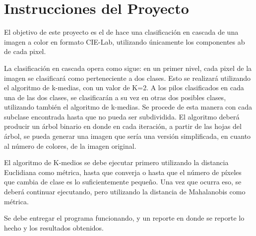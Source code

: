 \section{Instrucciones del Proyecto}\label{sec:project-instructions}
El objetivo de este proyecto es el de hace una clasificación en cascada de una imagen a color en formato CIE-Lab, utilizando únicamente los componentes ab de cada pixel.

La clasificación en cascada opera como sigue: en un primer nivel, cada pixel de la imagen se clasificará como perteneciente a dos clases.
Esto se realizará utilizando el algoritmo de k-medias, con un valor de K=2.
A los pilos clasificados en cada una de las dos clases, se clasificarán a su vez en otras dos posibles clases, utilizando también el algoritmo de k-medias.
Se procede de esta manera con cada subclase encontrada hasta que no pueda ser subdividida.
El algoritmo deberá producir un árbol binario en donde en cada iteración, a partir de las hojas del árbol, se pueda generar una imagen que sería una versión simplificada, en cuanto al número de colores, de la imagen original.

El algoritmo de K-medios se debe ejecutar primero utilizando la distancia Euclidiana como métrica, hasta que converja o hasta que el número de píxeles que cambia de clase es lo suficientemente pequeño.
Una vez que ocurra eso, se deberá continuar ejecutando, pero utilizando la distancia de Mahalanobis como métrica.

Se debe entregar el programa funcionando, y un reporte en donde se reporte lo hecho y los resultados obtenidos.
